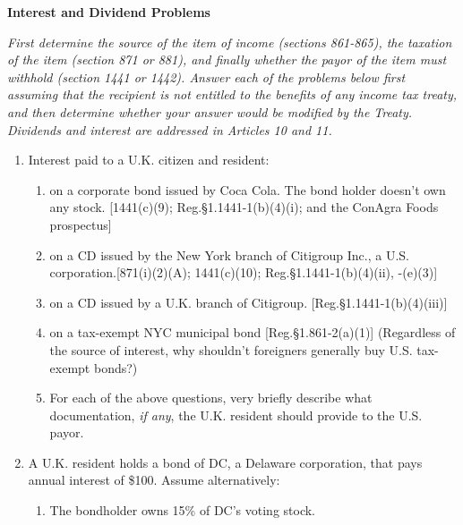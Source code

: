 	\begin{center}
		\textbf{Interest and Dividend Problems}
	\end{center}
	\begin{select}
 	\textit{First determine the source of the item of income (sections 861-865), the taxation of the item (section 871 or 881), and finally whether the payor of the item must withhold (section 1441 or 1442).  Answer each of the problems below first assuming that the recipient is not entitled to the benefits of any income tax treaty, and then determine whether your answer would be modified by the Treaty.  Dividends and interest are addressed in Articles 10 and 11.}   
 	\begin{enumerate}
		\item Interest paid to a U.K. citizen and resident:
			\begin{enumerate} 
				\item on a corporate bond issued by Coca Cola.  The bond holder doesn't own any stock. [1441(c)(9); Reg.\@ \S 1.1441-1(b)(4)(i); and the ConAgra Foods prospectus]
				\item on a CD issued by the New York branch of Citigroup Inc., a U.S. corporation.[871(i)(2)(A); 1441(c)(10); Reg.\@ \S 1.1441-1(b)(4)(ii), -(e)(3)]
				\item on a CD issued by a U.K. branch of Citigroup. [Reg.\@ \S 1.1441-1(b)(4)(iii)]
				\item on a tax-exempt NYC municipal bond [Reg.\@\@ \S 1.861-2(a)(1)] (Regardless of the source of interest, why shouldn't foreigners generally buy U.S. tax-exempt bonds?)
				\item For each of the above questions, very briefly describe what documentation, \emph{if any}, the U.K. resident should provide to the U.S. payor.  
			\end{enumerate}
		\item A U.K. resident holds a bond of DC, a Delaware corporation, that pays annual interest of \$100.   Assume alternatively:
			\begin{enumerate}
				
				\item The bondholder owns 15\% of DC's voting stock.
				

\end{enumerate}
\end{enumerate}
\end{select}
